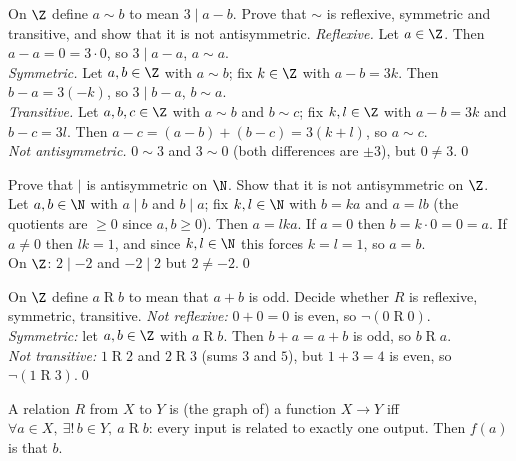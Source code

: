 \begin{hexample}\label{ex:mod3}
On $\Z$ define $a\sim b$ to mean $3\mid a-b$. Prove that $\sim$ is reflexive, symmetric and transitive, and show that it is not antisymmetric.
\solution
\emph{Reflexive.} Let $a\in\Z$. Then $a-a=0=3\cdot0$, so $3\mid a-a$, \ie $a\sim a$.\\
\emph{Symmetric.} Let $a,b\in\Z$ with $a\sim b$; fix $k\in\Z$ with $a-b=3k$. Then $b-a=3(-k)$, so $3\mid b-a$, \ie $b\sim a$.\\
\emph{Transitive.} Let $a,b,c\in\Z$ with $a\sim b$ and $b\sim c$; fix $k,l\in\Z$ with $a-b=3k$ and $b-c=3l$. Then $a-c=(a-b)+(b-c)=3(k+l)$, so $a\sim c$.\\
\emph{Not antisymmetric.} $0\sim3$ and $3\sim0$ (both differences are $\pm3$), but $0\neq3$.\qed
\end{hexample}

\begin{hexample}
Prove that $\mid$ is antisymmetric on $\N$. Show that it is not antisymmetric on $\Z$.
\solution
Let $a,b\in\N$ with $a\mid b$ and $b\mid a$; fix $k,l\in\N$ with $b=ka$ and $a=lb$ (the quotients are $\ge0$ since $a,b\ge0$). Then $a=lka$. If $a=0$ then $b=k\cdot0=0=a$. If $a\neq0$ then $lk=1$, and since $k,l\in\N$ this forces $k=l=1$, so $a=b$.\\
On $\Z$: $2\mid-2$ and $-2\mid2$ but $2\neq-2$.\qed
\end{hexample}

\begin{hexample}
On $\Z$ define $a\mathrel Rb$ to mean that $a+b$ is odd. Decide whether $R$ is reflexive, symmetric, transitive.
\solution
\emph{Not reflexive:} $0+0=0$ is even, so $\neg(0\mathrel R0)$.\\
\emph{Symmetric:} let $a,b\in\Z$ with $a\mathrel Rb$. Then $b+a=a+b$ is odd, so $b\mathrel Ra$.\\
\emph{Not transitive:} $1\mathrel R2$ and $2\mathrel R3$ (sums $3$ and $5$), but $1+3=4$ is even, so $\neg(1\mathrel R3)$.\qed
\end{hexample}

\begin{key}
A relation $R$ from $X$ to $Y$ is (the graph of) a function $X\to Y$ iff \ $\forall a\in X,\ \exists!\,b\in Y,\ a\mathrel Rb$: every input is related to exactly one output. Then $f(a)$ is that $b$.
\end{key}

